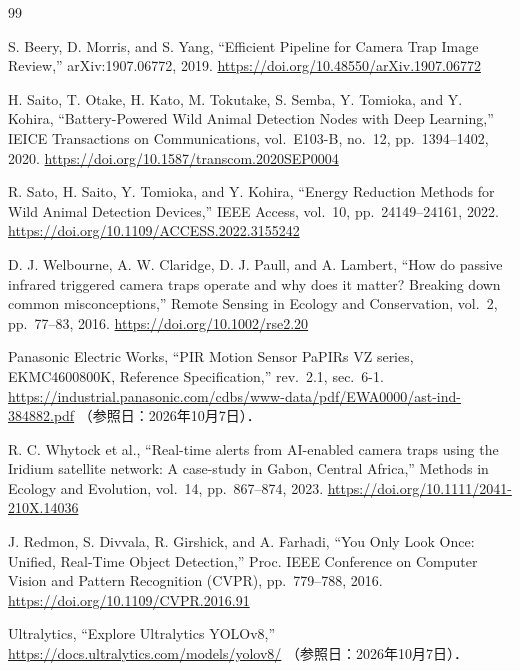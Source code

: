 \begin{thebibliography}{99}

  S. Beery, D. Morris, and S. Yang,
  ``Efficient Pipeline for Camera Trap Image Review,''
  arXiv:1907.06772, 2019.
  \url{https://doi.org/10.48550/arXiv.1907.06772}

  H. Saito, T. Otake, H. Kato, M. Tokutake, S. Semba, Y. Tomioka, and Y. Kohira,
  ``Battery-Powered Wild Animal Detection Nodes with Deep Learning,''
  IEICE Transactions on Communications, vol.~E103-B, no.~12,
  pp.~1394--1402, 2020.
  \url{https://doi.org/10.1587/transcom.2020SEP0004}

  R. Sato, H. Saito, Y. Tomioka, and Y. Kohira,
  ``Energy Reduction Methods for Wild Animal Detection Devices,''
  IEEE Access, vol.~10, pp.~24149--24161, 2022.
  \url{https://doi.org/10.1109/ACCESS.2022.3155242}

  D. J. Welbourne, A. W. Claridge, D. J. Paull, and A. Lambert,
  ``How do passive infrared triggered camera traps operate and why does it matter? Breaking down common misconceptions,''
  Remote Sensing in Ecology and Conservation, vol.~2, pp.~77--83, 2016.
  \url{https://doi.org/10.1002/rse2.20}

  Panasonic Electric Works,
  ``PIR Motion Sensor PaPIRs VZ series, EKMC4600800K,
  Reference Specification,'' rev.~2.1, sec.~6-1.
  \url{https://industrial.panasonic.com/cdbs/www-data/pdf/EWA0000/ast-ind-384882.pdf}
  （参照日：2026年10月7日）．

  R. C. Whytock et al.,
  ``Real-time alerts from AI-enabled camera traps using the Iridium satellite network:
  A case-study in Gabon, Central Africa,''
  Methods in Ecology and Evolution, vol.~14, pp.~867--874, 2023.
  \url{https://doi.org/10.1111/2041-210X.14036}

  J. Redmon, S. Divvala, R. Girshick, and A. Farhadi,
  ``You Only Look Once: Unified, Real-Time Object Detection,''
  Proc. IEEE Conference on Computer Vision and Pattern Recognition (CVPR),
  pp.~779--788, 2016.
  \url{https://doi.org/10.1109/CVPR.2016.91}

  Ultralytics, ``Explore Ultralytics YOLOv8,''
  \url{https://docs.ultralytics.com/models/yolov8/}
  （参照日：2026年10月7日）．


\end{thebibliography}
